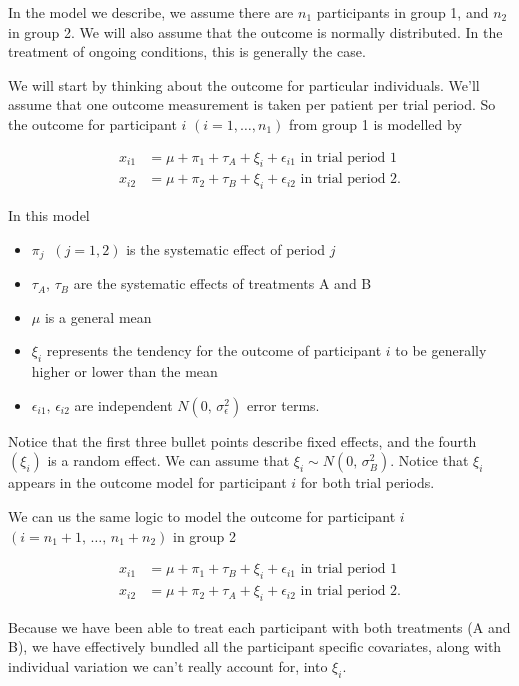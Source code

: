 \documentclass[
  openany]{book}
\providecommand{\tightlist}{%
  \setlength{\itemsep}{0pt}\setlength{\parskip}{0pt}}
\theoremstyle{definition}
\theoremstyle{definition}
\theoremstyle{definition}
\theoremstyle{definition}
\theoremstyle{remark}
\begin{document}
In the model we describe, we assume there are \(n_1\) participants in group 1, and \(n_2\) in group 2. We will also assume that the outcome is normally distributed. In the treatment of ongoing conditions, this is generally the case.

We will start by thinking about the outcome for particular individuals. We'll assume that one outcome measurement is taken per patient per trial period. So the outcome for participant \(i\) \((i = 1,\ldots,n_1)\) from group 1 is modelled by

\begin{align*}
x_{i1} & = \mu + \pi_1 + \tau_A + \xi_i + \epsilon_{i1} \text{ in trial period 1}\\
x_{i2} & = \mu + \pi_2 + \tau_B + \xi_i + \epsilon_{i2} \text{ in trial period 2.}
\end{align*}

In this model

\begin{itemize}
\tightlist
\item
  \(\pi_j\;\;(j=1,2)\) is the systematic effect of period \(j\)
\item
  \(\tau_A,\,\tau_B\) are the systematic effects of treatments A and B
\item
  \(\mu\) is a general mean
\item
  \(\xi_i\) represents the tendency for the outcome of participant \(i\) to be generally higher or lower than the mean
\item
  \(\epsilon_{i1},\,\epsilon_{i2}\) are independent \(N\left(0,\,\sigma_{\epsilon}^2\right)\) error terms.
\end{itemize}

Notice that the first three bullet points describe fixed effects, and the fourth \((\xi_i)\) is a random effect. We can assume that \(\xi_i \sim N\left(0,\,\sigma_B^2\right)\). Notice that \(\xi_i\) appears in the outcome model for participant \(i\) for both trial periods.

We can us the same logic to model the outcome for participant \(i\) \(\left(i=n_1+1,\,\ldots,\,n_1+n_2\right)\) in group 2

\begin{align*}
x_{i1} & = \mu + \pi_1 + \tau_B + \xi_i + \epsilon_{i1} \text{ in trial period 1}\\
x_{i2} & = \mu + \pi_2 + \tau_A + \xi_i + \epsilon_{i2} \text{ in trial period 2.}
\end{align*}

Because we have been able to treat each participant with both treatments (A and B), we have effectively bundled all the participant specific covariates, along with individual variation we can't really account for, into \(\xi_i\).
\end{document}
